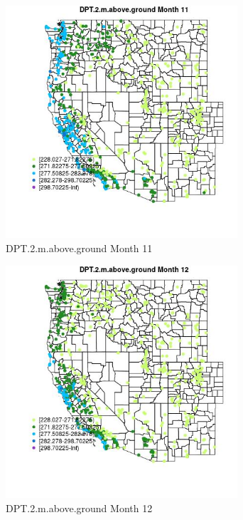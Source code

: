 \begin{figure} 
\centering  
\includegraphics[width=0.77\textwidth]{Code_Outputs/Report_ML_input_PM25_Step4_part_f_de_duplicated_aves_prioritize_24hr_obswNAs_MapObsMo11DPT2maboveground.jpg} 
\caption{\label{fig:Report_ML_input_PM25_Step4_part_f_de_duplicated_aves_prioritize_24hr_obswNAsMapObsMo11DPT2maboveground}DPT.2.m.above.ground Month 11} 
\end{figure} 
 

\begin{figure} 
\centering  
\includegraphics[width=0.77\textwidth]{Code_Outputs/Report_ML_input_PM25_Step4_part_f_de_duplicated_aves_prioritize_24hr_obswNAs_MapObsMo12DPT2maboveground.jpg} 
\caption{\label{fig:Report_ML_input_PM25_Step4_part_f_de_duplicated_aves_prioritize_24hr_obswNAsMapObsMo12DPT2maboveground}DPT.2.m.above.ground Month 12} 
\end{figure} 
 

